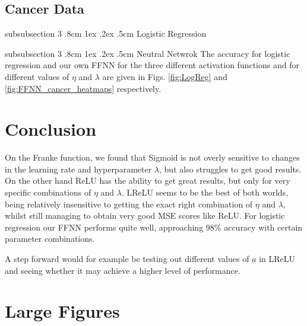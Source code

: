 \documentclass[%
reprint,s
amsmath,amssymb,
aps,
]{revtex4-2}
\makeatletter
\renewcommand{\subsubsection}{%
	\@startsection
	{subsubsection}%
	{3}%
	{\z@}%
	{.8cm \@plus1ex \@minus .2ex}%
	{.5cm}%
	{\normalfont\small\centering}%
}
\makeatother
\begin{document}
\subsection{Cancer Data}
\subsubsection{Logistic Regression}

\subsubsection{Neutral Netwrok}
The accuracy for logistic regression and our own FFNN for the three different activation functions and for different values of $\eta$ and $\lambda$ are given in Figs. \ref{fig:LogReg} and \ref{fig:FFNN_cancer_heatmaps} respectively.

\section{Conclusion}
On the Franke function, we found that Sigmoid is not overly sensitive to changes in the learning rate and hyperparameter $\lambda$, but also struggles to get good results. On the other hand ReLU has the ability to get great results, but only for very specific combinations of $\eta$ and $\lambda$. LReLU seems to be the best of both worlds, being relatively insensitive to getting the exact right combination of $\eta$ and $\lambda$, whilst still managing to obtain very good MSE scores like ReLU.  For logistic regression our FFNN performs quite well, approaching $98\%$ accuracy with certain parameter combinations.

A step forward would for example be testing out different values of $a$ in LReLU and seeing whether it may achieve a higher level of performance.




\appendix
\section{Large Figures}
\label{Appendix:A}

\end{document}
